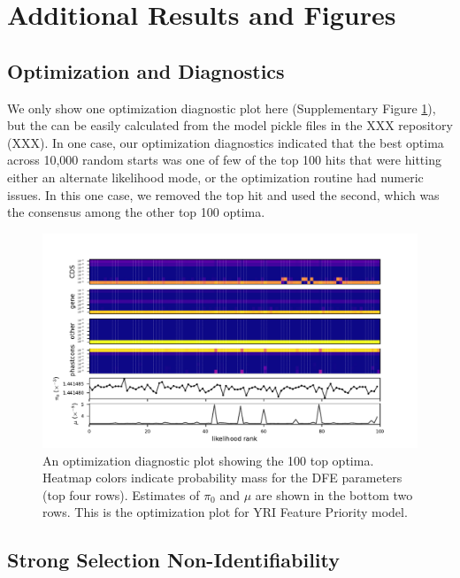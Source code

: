 \documentclass[11pt]{article}
\begin{document}
\section{Additional Results and Figures}

\subsection{Optimization and Diagnostics}
\label{supp:optim}

We only show one optimization diagnostic plot here (Supplementary Figure
\ref{suppfig:diag-plot}), but the can be easily calculated from the model
pickle files in the XXX repository (XXX). In one case, our optimization
diagnostics indicated that the best optima across 10,000 random starts was one
of few of the top 100 hits that were hitting either an alternate likelihood
mode, or the optimization routine had numeric issues. In this one case, we
removed the top hit and used the second, which was the consensus among the
other top 100 optima. 

\begin{figure}[htbp]
  \label{suppfig:diag-plot}
  \centering
  \includegraphics[width=\textwidth]{figures/supplementary/figure_feature_priority_yri_full_diag.pdf}

  \caption{ An optimization diagnostic plot showing the 100 top optima. Heatmap
  colors indicate probability mass for the DFE parameters (top four rows).
  Estimates of $\pi_0$ and $\mu$ are shown in the bottom two rows. This is the
optimization plot for YRI Feature Priority model.}
\end{figure}


\subsection{Strong Selection Non-Identifiability}
\label{supp:}
\end{document}
